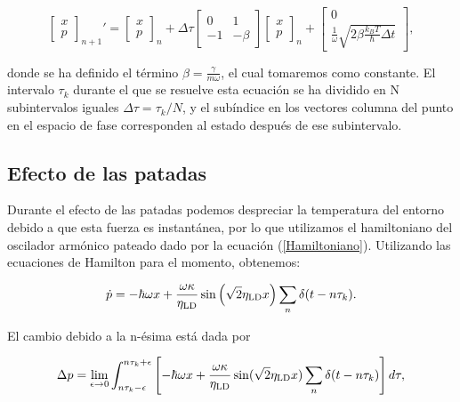 \documentclass[letterpaper,12pt,oneside]{book}
\begin{document}
	\begin{equation}
		\begin{bmatrix}
		x \\ p
		\end{bmatrix}_{n+1}' = 
		\begin{bmatrix}
		x \\ p
		\end{bmatrix}_{n}
		+ \Delta\tau
		\begin{bmatrix}
		0 & 1 \\
		-1 & -\beta
		\end{bmatrix}
		\begin{bmatrix}
		x \\ p
		\end{bmatrix}_n
		+
		\begin{bmatrix}
		0 \\ \frac{1}{\omega}\sqrt{ 2\beta\frac{k_BT}{\hbar}{\Delta t} }
		\end{bmatrix},
	\end{equation}
	
	\noindent donde se ha definido el t\'ermino $\beta = \frac{\gamma}{m\omega}$, el cual tomaremos como constante. El intervalo $\tau_k$ durante el que se resuelve esta ecuaci\'on se ha dividido en N subintervalos iguales $\Delta\tau = \tau_k / N$, y el sub\'indice en los vectores columna del punto en el espacio de fase corresponden al estado despu\'es de ese subintervalo.
	
	\subsection{Efecto de las patadas}
	
	Durante el efecto de las patadas podemos despreciar la temperatura del entorno debido a que esta fuerza es instant\'anea, por lo que utilizamos el hamiltoniano del oscilador arm\'onico pateado dado por la ecuaci\'on (\ref{Hamiltoniano}). Utilizando las ecuaciones de Hamilton para el momento, obtenemos:
	
	\begin{equation}
		\dot{p} = -\hbar\omega x + \frac{\omega\kappa}{\eta_{\rm LD}}\sin \left( \sqrt{2} \eta_{\rm LD} x\right) \sum_n\delta(t-n\tau_k).
	\end{equation}
	
	El cambio debido a la n-\'esima est\'a dada por
	
	\begin{equation}
		\Delta p = \lim_{\epsilon \rightarrow 0} \int_{n\tau_k-\epsilon}^{n\tau_k+\epsilon} \left[-\hbar\omega x + \frac{\omega\kappa}{\eta_{\rm LD}}\sin (\sqrt{2} \eta_{\rm LD} x) \sum_n\delta(t-n\tau_k) \right]d\tau,
	\end{equation}
	
\end{document}

